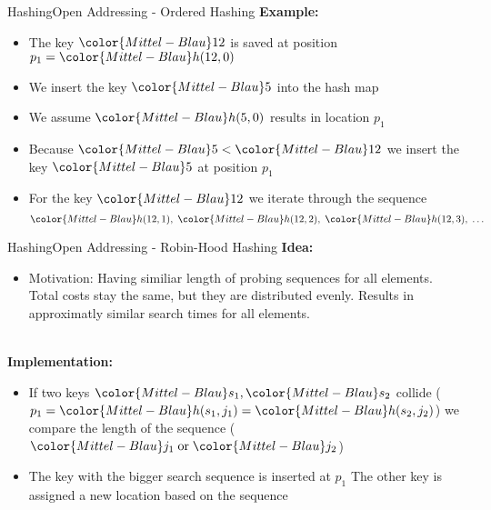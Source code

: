 
\begin{frame}{Hashing}{Open Addressing - Ordered Hashing}
  \textbf{Example:}
  \begin{itemize}
    \item
      The key ${\color{Mittel-Blau}12}$ is saved at position
      $p_1 = {\color{Mittel-Blau}h(12, 0)}$
    \item
      We insert the key ${\color{Mittel-Blau}5}$ into the hash map
    \item
      We assume ${\color{Mittel-Blau}h(5,0)}$ results in location $p_1$
    \item
      Because ${\color{Mittel-Blau}5} < {\color{Mittel-Blau}12}$ we insert
      the key ${\color{Mittel-Blau}5}$ at position $p_1$
    \item
      For the key ${\color{Mittel-Blau}12}$ we iterate through the sequence
      \begin{displaymath}
        {\color{Mittel-Blau}h(12, 1)} ,\;
        {\color{Mittel-Blau}h(12, 2)} ,\;
        {\color{Mittel-Blau}h(12, 3)} ,\;
        \dots
      \end{displaymath}
  \end{itemize}
\end{frame}


\begin{frame}{Hashing}{Open Addressing - Robin-Hood Hashing}
  \textbf{Idea:}
  \begin{itemize}
    \item <2->Motivation: 
      Having similiar length of probing sequences for all elements.
      Total costs stay the same, but they are distributed evenly.
      Results in approximatly similar search times for all elements.
  \end{itemize}
  \hfill\\[0.5em]
  \textbf{Implementation:}
  \begin{itemize}
    \item<4->
      If two keys ${\color{Mittel-Blau}s_1}, {\color{Mittel-Blau}s_2}$ collide
      (\begin{math}
        p_1 = {\color{Mittel-Blau}h(s_1, j_1)}
            = {\color{Mittel-Blau}h(s_2, j_2)}
      \end{math})
      we compare the length of the sequence
      (\begin{math}
        {\color{Mittel-Blau}j_1} \;\text{or}\; {\color{Mittel-Blau}j_2}
      \end{math})
    \item<5->
      The key with the bigger search sequence is inserted at $p_1$
      The other key is assigned a new location based on the sequence
  \end{itemize}
\end{frame}

